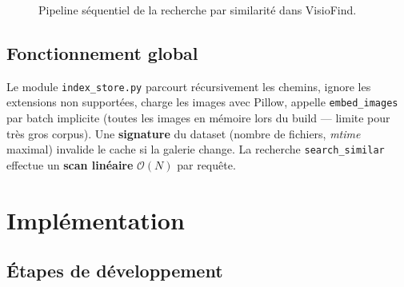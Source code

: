 \documentclass[11pt,a4paper,openany]{report}
\begin{document}
\begin{figure}[htbp]
  \centering
  \caption{Pipeline séquentiel de la recherche par similarité dans VisioFind.}
  \label{fig:pipeline}
\end{figure}

\section{Fonctionnement global}

Le module \texttt{index\_store.py} parcourt récursivement les chemins, ignore les extensions non supportées, charge les images avec Pillow, appelle \texttt{embed\_images} par batch implicite (toutes les images en mémoire lors du build — limite pour très gros corpus). Une \textbf{signature} du dataset (nombre de fichiers, \emph{mtime} maximal) invalide le cache si la galerie change. La recherche \texttt{search\_similar} effectue un \textbf{scan linéaire} $\mathcal{O}(N)$ par requête.

\chapter{Implémentation}

\section{Étapes de développement}
\end{document}
